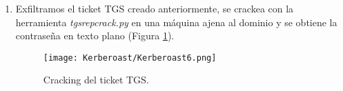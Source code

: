 \begin{enumerate}
\item Exfiltramos el ticket TGS creado anteriormente, se crackea con la herramienta {\it tgsrepcrack.py} en una máquina ajena al dominio y se obtiene la contraseña en texto plano (Figura \ref{Kerberoast6}). 
\begin{figure}[H] %
\begin{center}
\texttt{[image: Kerberoast/Kerberoast6.png]}
\end{center}
\caption{Cracking del ticket TGS.}
\label{Kerberoast6}
\end{figure}

\end{enumerate}
